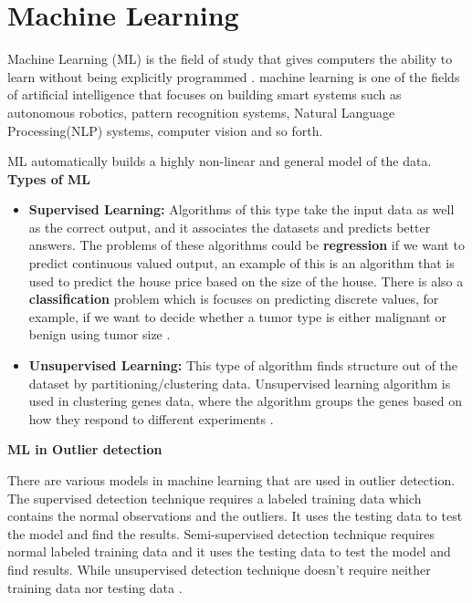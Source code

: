 \section{Machine Learning}
Machine Learning (ML) is the field of study that gives computers the ability to learn without being explicitly programmed \citep{Andrew}. machine learning is one of the fields of artificial intelligence that focuses on building smart systems such as autonomous robotics, pattern recognition systems, Natural Language Processing(NLP) systems, computer vision and so forth.

ML automatically builds a highly non-linear and general model of the data.
\textbf{Types of ML}
\begin{itemize}
\item \textbf{Supervised Learning:}
Algorithms of this type take the input data as well as the correct output, and it associates the datasets and predicts better answers. The problems of these algorithms could be \textbf{regression} if we want to predict continuous valued output, an example of this is an algorithm that is used to predict the house price based on the size of the house. There is also a \textbf{classification} problem which is focuses on predicting discrete values, for example, if we want to decide whether a tumor type is either malignant or benign using tumor size \citep{Andrew}.
\item \textbf{Unsupervised Learning:}
This type of algorithm finds structure out of the dataset by partitioning/clustering data. Unsupervised learning algorithm is used in clustering genes data, where the algorithm groups the genes based on how they respond to different experiments \citep{Andrew}.
\end{itemize}

\textbf{ML in Outlier detection}

There are various models in machine learning that are used in outlier detection. The supervised detection technique requires a labeled training data which contains the normal observations and the outliers. It uses the testing data to test the model and find the results. Semi-supervised detection technique requires normal labeled training data and it uses the testing data to test the model and find results. While unsupervised detection technique doesn't require neither training data nor testing data \citep{Goldstein}.

